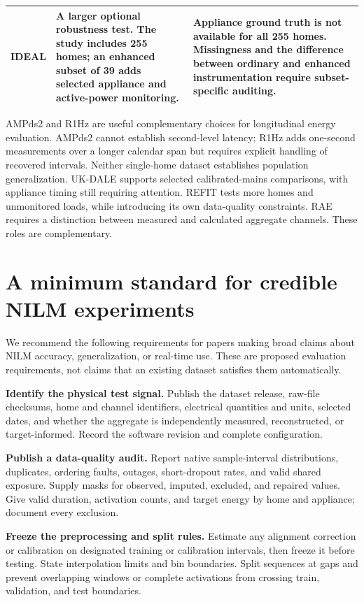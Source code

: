 \documentclass[11pt,letterpaper]{article}
\begin{document}
\begin{longtable}{|>{\centering\arraybackslash}p{0.924in}|>{\raggedright\arraybackslash}p{2.925in}|>{\raggedright\arraybackslash}p{2.617in}|}
IDEAL \cite{ref12} & A larger optional robustness test. The study includes 255 homes; an enhanced subset of 39 adds selected appliance and active-power monitoring. & Appliance ground truth is not available for all 255 homes. Missingness and the difference between ordinary and enhanced instrumentation require subset-specific auditing.\\\hline
\end{longtable}
\endgroup
AMPds2 and R1Hz are useful complementary choices for longitudinal energy evaluation. AMPds2 cannot establish second-level latency; R1Hz adds one-second measurements over a longer calendar span but requires explicit handling of recovered intervals. Neither single-home dataset establishes population generalization. UK-DALE supports selected calibrated-mains comparisons, with appliance timing still requiring attention. REFIT tests more homes and unmonitored loads, while introducing its own data-quality constraints. RAE requires a distinction between measured and calculated aggregate channels. These roles are complementary.

\section{A minimum standard for credible NILM experiments}
We recommend the following requirements for papers making broad claims about NILM accuracy, generalization, or real-time use. These are proposed evaluation requirements, not claims that an existing dataset satisfies them automatically.

\textbf{Identify the physical test signal.} Publish the dataset release, raw-file checksums, home and channel identifiers, electrical quantities and units, selected dates, and whether the aggregate is independently measured, reconstructed, or target-informed. Record the software revision and complete configuration.

\textbf{Publish a data-quality audit.} Report native sample-interval distributions, duplicates, ordering faults, outages, short-dropout rates, and valid shared exposure. Supply masks for observed, imputed, excluded, and repaired values. Give valid duration, activation counts, and target energy by home and appliance; document every exclusion.

\textbf{Freeze the preprocessing and split rules.} Estimate any alignment correction or calibration on designated training or calibration intervals, then freeze it before testing. State interpolation limits and bin boundaries. Split sequences at gaps and prevent overlapping windows or complete activations from crossing train, validation, and test boundaries.
\end{document}
